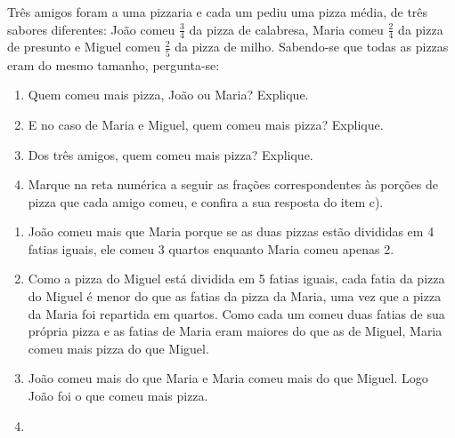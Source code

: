 \documentclass[10 pt,usenames,dvipsnames, oneside]{article}
\begin{document}
Três amigos foram a uma pizzaria e cada um pediu uma pizza média, de três sabores diferentes: João comeu $\frac{3}{4}$ da pizza de calabresa, Maria comeu  $\frac{2}{4}$ da pizza de presunto e Miguel comeu $\frac{2}{5}$ da pizza de milho. Sabendo-se que todas as pizzas eram do mesmo tamanho, pergunta-se:
\begin{enumerate}
  \item     Quem comeu mais pizza, João ou Maria? Explique.
  \item     E no caso de Maria e Miguel, quem comeu mais pizza? Explique.
  \item     Dos três amigos, quem comeu mais pizza? Explique.
  \item     Marque na reta numérica a seguir as frações correspondentes às porções de pizza que cada amigo comeu, e confira a sua resposta do item c).
\end{enumerate} %

\begin{center}
\end{center}


\ifdefined\prof
\begin{solucao}

\begin{enumerate} %
\item João comeu mais que Maria porque se as duas pizzas estão divididas em 4 fatias iguais, ele comeu 3 quartos enquanto Maria comeu apenas 2.
\item Como a pizza do Miguel está dividida em 5 fatias iguais, cada fatia da pizza do Miguel é menor do que as fatias da pizza da Maria, uma vez que a pizza da Maria foi repartida em quartos. Como cada um comeu duas fatias de sua própria pizza e as fatias de Maria eram maiores do que as de Miguel, Maria comeu mais pizza do que Miguel.
\item João comeu mais do que Maria e Maria comeu mais do que Miguel. Logo João foi o que comeu mais pizza.

\item {}
{
}
\end{enumerate} %

\end{solucao}
\fi
\end{document}
